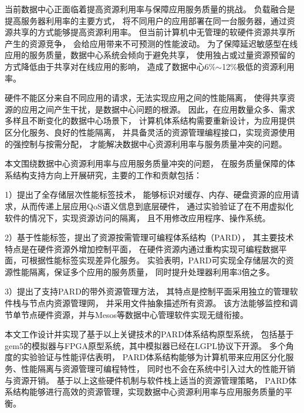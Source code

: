 \begin{cabstract}
  当前数据中心正面临着提高资源利用率与保障应用服务质量的挑战。
  负载融合是提高服务器利用率的主要方式，
  将不同用户的应用部署在同一台服务器，通过资源共享的方式能够提高资源利用率。
  但当前计算机中无管理的软硬件资源共享所产生的资源竞争，
  会给应用带来不可预测的性能波动。
  为了保障延迟敏感型在线应用的服务质量，数据中心系统会倾向于避免共享，
  使用独占或过量资源预留的方式降低由于共享对在线应用的影响，
  造成了数据中心6\%$\sim$12\%极低的资源利用率。

  硬件不能区分来自不同应用的请求，无法实现应用之间的性能隔离，
  使得共享资源的应用之间产生干扰，是数据中心问题的根源。
  因此，在应用数量众多、需求多样且不断变化的数据中心场景下，
  计算机体系结构需要重新设计，为应用提供区分化服务、良好的性能隔离，
  并具备灵活的资源管理编程接口，实现资源使用的强控制与按需分配，
  才能解决数据中心资源利用率与服务质量冲突的问题。

  本文围绕数据中心资源利用率与应用服务质量冲突的问题，
  在服务质量保障的体系结构支持方向上开展研究，主要的工作和贡献包括：

  1）提出了全存储层次性能标签技术，
     能够标识对缓存、内存、硬盘资源的应用请求，从而传递上层应用QoS语义信息到底层硬件，
     通过实验验证了在不用虚拟化软件的情况下，实现资源访问的隔离，
     且不用修改应用程序、操作系统。

  2）基于性能标签，提出了资源按需管理可编程体系结构（PARD），
     其主要技术特点是在硬件资源外增加控制平面，
     在硬件资源内通过重构实现可编程数据平面，可根据性能标签实现差异化服务。
     实验表明，PARD可实现全存储层次的资源性能隔离，保证多个应用的服务质量，
     同时提升处理器利用率3倍之多。

  3）提出了支持PARD的带外资源管理方法，
     其特点是控制平面采用独立的管理软件栈与节点内资源管理网，
     并采用文件抽象描述所有资源。
     该方法能够监控和调节单节点硬件资源，并与Mesos等数据中心管理软件实现无缝衔接。

  本文工作设计并实现了基于以上关键技术的PARD体系结构原型系统，
  包括基于gem5的模拟器与FPGA原型系统，其中模拟器已经在LGPL协议下开源。
  多个角度的实验验证与性能评估表明，
  PARD体系结构能够为计算机带来应用区分化服务、性能隔离与资源管理可编程特性，
  同时也不会在系统中引入过大的性能开销与资源开销。
  基于以上这些硬件机制与软件栈上适当的资源管理策略，
  PARD体系结构能够进行高效的资源管理，实现数据中心资源利用率与应用服务质量的平衡。



\end{cabstract}
